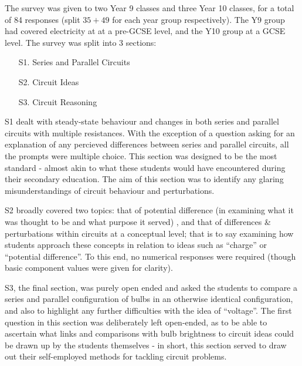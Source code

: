 \documentclass[a4paper,openany,nobib]{tufte-book}
\begin{document}
The survey was given to two Year 9 classes and three Year 10 classes, for a total of 84 responses (split $35+49$ for each year group respectively). The Y9 group had covered electricity at at a pre-GCSE level, and the Y10 group at a GCSE level. The survey was split into 3 sections:
\begin{itemize}
	\item[S1.] Series and Parallel Circuits
	\item[S2.] Circuit Ideas
	\item[S3.] Circuit Reasoning
\end{itemize}
S1 dealt with steady-state behaviour and changes in both series and parallel circuits with multiple resistances. With the exception of a question asking for an explanation of any percieved differences between series and parallel circuits, all the prompts were multiple choice. This section was designed to be the most standard - almost akin to what these students would have encountered during their secondary education. The aim of this section was to identify any glaring misunderstandings of circuit behaviour and perturbations.

S2 broadly covered two topics:
that of potential difference (in examining what it was thought to be and what purpose it served)
, and that of differences \& perturbations within circuits at a conceptual level; that is to say examining how students approach these concepts in relation to ideas such as ``charge'' or ``potential difference''. 
To this end, no numerical responses were required (though basic component values were given for clarity).

S3, the final section, was purely open ended and asked the students to compare a series and parallel configuration of bulbs in an otherwise identical configuration, and also to highlight any further difficulties with the idea of ``voltage''.
The first question in this section was deliberately left open-ended, as to be able to ascertain what links and comparisons with bulb brightness to circuit ideas could be drawn up by the students themselves - in short, this section served to draw out their self-employed methods for tackling circuit problems.
\backmatter
\end{document}
